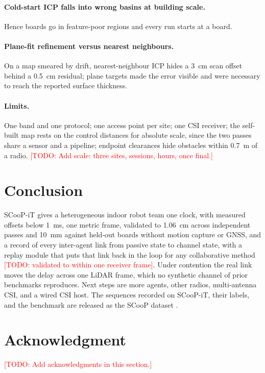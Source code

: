\documentclass[journal]{IEEEtran}
\newcommand{\todo}[1]{\textcolor{red}{[TODO: #1]}}
\begin{document}
\paragraph{Cold-start ICP falls into wrong basins at building scale.}
Hence boards go in feature-poor regions and every run starts at a
board.

\paragraph{Plane-fit refinement versus nearest neighbours.} On a map
smeared by drift, nearest-neighbour ICP hides a \SI{3}{\centi\metre}
scan offset behind a \SI{0.5}{\centi\metre} residual; plane targets
made the error visible and were necessary to reach the reported
surface thickness.

\paragraph{Limits.} One band and one protocol; one access point per
site; one CSI receiver; the self-built map rests on the control
distances for absolute scale, since the two passes share a sensor and
a pipeline; endpoint clearances hide obstacles within
\SI{0.7}{\metre} of a radio. \todo{Add scale: three sites, sessions,
hours, once final.}

\section{Conclusion}
\label{sec:conclusion}
SCooP-iT gives a heterogeneous indoor robot team one clock, with
measured offsets below \SI{1}{\milli\second}, one metric frame,
validated to \SI{1.06}{\centi\metre} across independent passes and
\SI{10}{\milli\metre} against held-out boards without motion capture
or GNSS, and a record of every inter-agent link from passive
state to channel state, with a replay module that puts that link back
in the loop for any collaborative method \todo{validated to within one
receiver frame}. Under contention the real link moves the delay across
one LiDAR frame, which no synthetic channel of prior benchmarks
reproduces. Next steps are more agents, other radios, multi-antenna
CSI, and a wired CSI host. The sequences recorded on SCooP-iT, their
labels, and the benchmark are released as the SCooP dataset
\cite{scoop_dataset}.

\section*{Acknowledgment}
\todo{Add acknowledgments in this section.}




\end{document}
